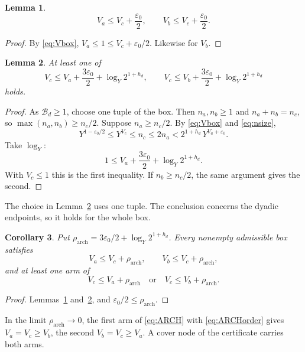 \documentclass{amsart}
\newtheorem{lemma}{Lemma}[section]
\newtheorem{corollary}[lemma]{Corollary}
\theoremstyle{definition}
\theoremstyle{plain}
\numberwithin{equation}{section}
\numberwithin{table}{section}
\begin{document}
\begin{lemma}\label{lem:archorder}
\[
 V_a\le V_c+\frac{\varepsilon_0}2,\qquad V_b\le V_c+\frac{\varepsilon_0}2 .
\]
\end{lemma}

\begin{proof}
By \eqref{eq:Vbox}, $V_a\le1\le V_c+\varepsilon_0/2$. Likewise for $V_b$.
\end{proof}

\begin{lemma}\label{lem:archcover}
At least one of
\[
 V_c\le V_a+\frac{3\varepsilon_0}2+\log_Y2^{1+h_d},
 \qquad
 V_c\le V_b+\frac{3\varepsilon_0}2+\log_Y2^{1+h_d}
\]
holds.
\end{lemma}

\begin{proof}
As $\mathcal B_d\ge1$, choose one tuple of the box. Then $n_a,n_b\ge1$ and
$n_a+n_b=n_c$, so $\max(n_a,n_b)\ge n_c/2$. Suppose $n_a\ge n_c/2$. By
\eqref{eq:Vbox} and \eqref{eq:nsize},
\[
 Y^{1-\varepsilon_0/2}\le Y^{V_c}\le n_c\le2n_a
 <2^{1+h_d}\,Y^{V_a+\varepsilon_0}.
\]
Take $\log_Y$:
\[
 1\le V_a+\frac{3\varepsilon_0}2+\log_Y2^{1+h_d}.
\]
With $V_c\le1$ this is the first inequality. If $n_b\ge n_c/2$, the same
argument gives the second.
\end{proof}

The choice in Lemma~\ref{lem:archcover} uses one tuple. The conclusion
concerns the dyadic endpoints, so it holds for the whole box.

\begin{corollary}\label{cor:arch}
Put $\rho_{\mathrm{arch}}=3\varepsilon_0/2+\log_Y2^{1+h_d}$. Every nonempty
admissible box satisfies
\begin{equation}\label{eq:ARCHorder}
 V_a\le V_c+\rho_{\mathrm{arch}},\qquad V_b\le V_c+\rho_{\mathrm{arch}},
\end{equation}
and at least one arm of
\begin{equation}\label{eq:ARCH}
 V_c\le V_a+\rho_{\mathrm{arch}}\quad\text{or}\quad V_c\le V_b+\rho_{\mathrm{arch}} .
\end{equation}
\end{corollary}

\begin{proof}
Lemmas~\ref{lem:archorder} and~\ref{lem:archcover}, and
$\varepsilon_0/2\le\rho_{\mathrm{arch}}$.
\end{proof}

In the limit $\rho_{\mathrm{arch}}\to0$, the first arm of \eqref{eq:ARCH} with
\eqref{eq:ARCHorder} gives $V_a=V_c\ge V_b$, the second $V_b=V_c\ge V_a$.
A cover node of the certificate carries both arms.
\end{document}
